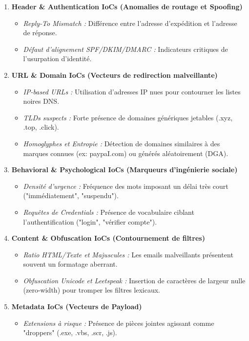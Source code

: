 \begin{enumerate}
    \item \textbf{Header \& Authentication IoCs (Anomalies de routage et Spoofing)}
    \begin{itemize}
        \item \textit{Reply-To Mismatch :} Différence entre l'adresse d'expédition et l'adresse de réponse.
        \item \textit{Défaut d'alignement SPF/DKIM/DMARC :} Indicateurs critiques de l'usurpation d'identité.
    \end{itemize}
    
    \item \textbf{URL \& Domain IoCs (Vecteurs de redirection malveillante)}
    \begin{itemize}
        \item \textit{IP-based URLs :} Utilisation d'adresses IP nues pour contourner les listes noires DNS.
        \item \textit{TLDs suspects :} Forte présence de domaines génériques jetables (.xyz, .top, .click).
        \item \textit{Homoglyphes et Entropie :} Détection de domaines similaires à des marques connues (ex: paypaI.com) ou générés aléatoirement (DGA).
    \end{itemize}
    
    \item \textbf{Behavioral \& Psychological IoCs (Marqueurs d'ingénierie sociale)}
    \begin{itemize}
        \item \textit{Densité d'urgence :} Fréquence des mots imposant un délai très court ("immédiatement", "suspendu").
        \item \textit{Requêtes de Credentials :} Présence de vocabulaire ciblant l'authentification ("login", "vérifier compte").
    \end{itemize}

    \item \textbf{Content \& Obfuscation IoCs (Contournement de filtres)}
    \begin{itemize}
        \item \textit{Ratio HTML/Texte et Majuscules :} Les emails malveillants présentent souvent un formatage aberrant.
        \item \textit{Obfuscation Unicode et Leetspeak :} Insertion de caractères de largeur nulle (zero-width) pour tromper les filtres lexicaux.
    \end{itemize}

    \item \textbf{Metadata IoCs (Vecteurs de Payload)}
    \begin{itemize}
        \item \textit{Extensions à risque :} Présence de pièces jointes agissant comme "droppers" (.exe, .vbs, .scr, .js).
    \end{itemize}
\end{enumerate}

